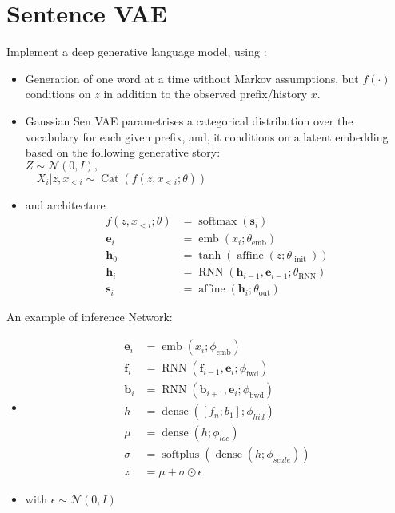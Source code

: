\section{Sentence VAE}

Implement a deep generative language model, using :

\begin{itemize}
 
 \item Generation of one word at a time without Markov assumptions, but $f(\cdot)$ conditions on $z$ in addition to the observed prefix/history $x$.
 \item Gaussian Sen VAE  parametrises a categorical distribution over the vocabulary for each given prefix, and, it conditions on a latent embedding based on the following generative story:\\
$Z \sim \mathcal{N}(0, I),$ \\ $ \quad X_{i} | z, x_{<i} \sim \operatorname{Cat}\left(f\left(z, x_{<i} ; \theta\right)\right)$
\item[] and architecture
\begin{equation}
\begin{aligned} 
f\left(z, x_{<i} ; \theta\right) &=\operatorname{softmax}\left(\mathbf{s}_{i}\right) \\
\mathbf{e}_{i} &=\operatorname{emb}\left(x_{i} ; \theta_{\mathrm{emb}}\right) \\ 
\mathbf{h}_{0} &=\tanh \left(\operatorname{affine}\left(z ; \theta_{\text { init }}\right)\right) \\ 
\mathbf{h}_{i} &=\operatorname{RNN}\left(\mathbf{h}_{i-1}, \mathbf{e}_{i-1} ; \theta_{\mathrm{RNN}}\right) \\ 
\mathbf{s}_{i} &=\operatorname{affine}\left(\mathbf{h}_{i} ; \theta_{\mathrm{out}}\right) 
\end{aligned}
\end{equation}
\end{itemize}

An example of inference Network:
\begin{itemize}
\item[] 
\begin{equation}
\begin{aligned}
\mathbf{e}_{i} &=\operatorname{emb}\left(x_{i} ; \phi_{\mathrm{emb}}\right) \\ 
\mathbf{f}_{i} &=\operatorname{RNN}\left(\mathbf{f}_{i-1}, \mathbf{e}_{i} ; \phi_{\mathrm{fwd}}\right) \\
\mathbf{b}_{i} &=\operatorname{RNN}\left(\mathbf{b}_{i+1}, \mathbf{e}_{i} ; \phi_{\mathrm{bwd}}\right) \\
h &= \operatorname{dense}([f_n ; b_1]; \phi_{hid}) \\
\mu &= \operatorname{dense}(h; \phi_{loc}) \\
\sigma &= \operatorname{softplus}(\operatorname{dense}(h; \phi_{scale})) \\
z &=  \mu + \sigma \odot \epsilon
\end{aligned}
\end{equation}
\item with $\epsilon \sim \mathcal N (0, I)$
\end{itemize}

